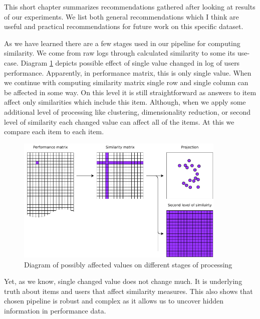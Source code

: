 \documentclass[
  digital, %
  table,   %
  nolof,     %
  nolot,     %
  nocover,
  color
]{fithesis3}
\begin{document}


This short chapter summarizes recommendations gathered after looking at results of our experiments. We list both general recommendations which I think are useful and practical recommendations for future work on this specific dataset.


As we have learned there are a few stages used in our pipeline for computing similarity. We come from raw logs through calculated similarity to some its use-case. Diagram \ref{fig:affected_diagram} depicts possible effect of single value changed in log of users performance. Apparently, in performance matrix, this is only single value. When we continue with computing similarity matrix single row and single column can be affected in some way. On this level it is still straightforward as answers to item affect only similarities which include this item. Although, when we apply some additional level of processing like clustering, dimensionality reduction, or second level of similarity each changed value can affect all of the items. At this we compare each item to each item.

\begin{figure}
  \includegraphics[width=10cm]{img/affected_diagram}
  \caption{Diagram of possibly affected values on different stages of processing}
  \label{fig:affected_diagram}
\end{figure}

Yet, as we know, single changed value does not change much. It is underlying truth about items and users that affect similarity measures. This also shows that chosen pipeline is robust and complex as it allows us to uncover hidden information in performance data.
\end{document}
